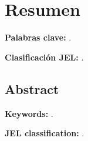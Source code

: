 \chapter*{Resumen}

\lipsum[1][1-10]

\medskip
\textbf{Palabras clave:} \palabrasclave.

\textbf{Clasificación JEL:} \codigosjel.

\begin{otherlanguage}{american}
\chapter*{Abstract}

\lipsum[1][1-10]

\medskip
\textbf{Keywords:} \keywordsingles.

\textbf{JEL classification:} \codigosjel.
\end{otherlanguage}
